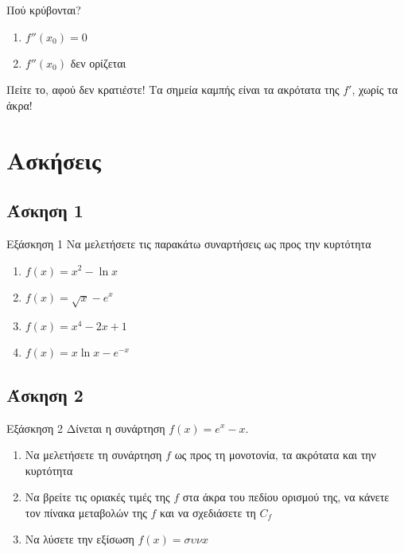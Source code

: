 \documentclass[greek]{beamer}
\begin{document}
\begin{frame}{Πού κρύβονται?}
  \begin{enumerate}
    \item<1-> $f''(x_0)=0$
    \item<2-> $f''(x_0)$ δεν ορίζεται
  \end{enumerate}
   {Πείτε το, αφού δεν κρατιέστε! Τα σημεία καμπής είναι τα ακρότατα της $f'$, χωρίς τα άκρα!}
\end{frame}

\section{Ασκήσεις}
\subsection{Άσκηση 1}
\begin{frame}[label=Άσκηση1,t]{Εξάσκηση 1}
  Να μελετήσετε τις παρακάτω συναρτήσεις ως προς την κυρτότητα
  \begin{enumerate}
    \item<1-> $f(x)=x^2-\ln x$
    \item<2-> $f(x)=\sqrt{x}-e^x$
    \item<3-> $f(x)=x^4-2x+1$
    \item<4-> $f(x)=x\ln x-e^{-x}$
  \end{enumerate}

\end{frame}

\subsection{Άσκηση 2}
\begin{frame}[label=Άσκηση2,t]{Εξάσκηση 2}
  Δίνεται η συνάρτηση $f(x)=e^x-x$.
  \begin{enumerate}
    \item<1-> Να μελετήσετε τη συνάρτηση $f$ ως προς τη μονοτονία, τα ακρότατα και την κυρτότητα
    \item<2-> Να βρείτε τις οριακές τιμές της $f$ στα άκρα του πεδίου ορισμού της, να κάνετε τον πίνακα μεταβολών της $f$ και να σχεδιάσετε τη $C_f$
    \item<3-> Να λύσετε την εξίσωση $f(x)=συνx$
  \end{enumerate}

\end{frame}
\end{document}
